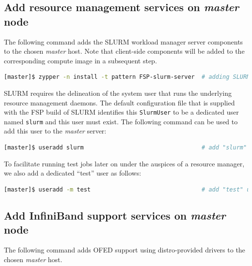 \documentclass[letterpaper]{article}
\begin{document}
\subsection{Add resource management services on {\em master} node} \label{sec:add_rm}

The following command adds the SLURM workload manager server components to the
chosen {\em master} host. Note that client-side components will be added to
the corresponding compute image in a subsequent step.

\begin{lstlisting}[language=bash,keywords={}]
[master]$ zypper -n install -t pattern FSP-slurm-server  # adding SLURM server support
\end{lstlisting}

SLURM requires the delineation of the system user that runs the underlying
resource management daemons. The default configuration file that is supplied
with the FSP build of SLURM identifies this \texttt{SlurmUser} to be a
dedicated user named \texttt{slurm} and this user must exist. 
The following command can be used to add this user to the {\em
  master} server:

\begin{lstlisting}[language=bash,keywords={}]
[master]$ useradd slurm                                  # add "slurm" user
\end{lstlisting}

To facilitate running test jobs later on under the auspices of a resource
manager, we also add a dedicated ``test'' user as follows:

\begin{lstlisting}[language=bash,keywords={}]
[master]$ useradd -m test                                # add "test" user
\end{lstlisting}

\subsection{Add InfiniBand support services on {\em master} node} \label{sec:add_ofed}

The following command adds OFED support using distro-provided drivers to the
chosen {\em master} host. 
\end{document}
